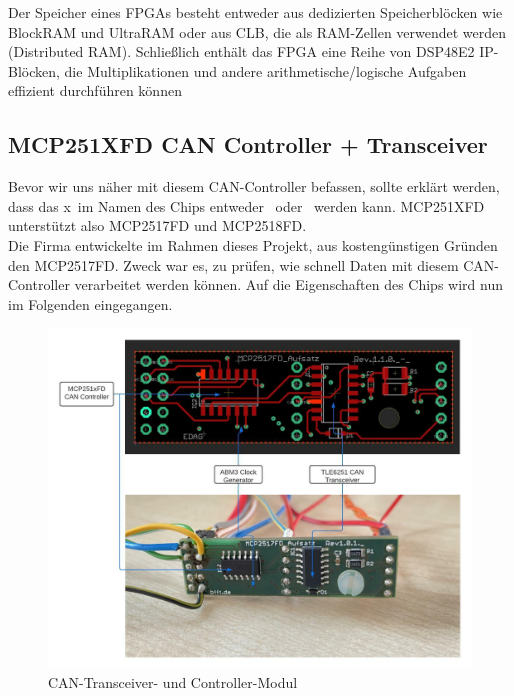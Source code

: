 Der Speicher eines FPGAs besteht entweder aus dedizierten Speicherblöcken wie BlockRAM und UltraRAM oder aus CLB, die als RAM-Zellen verwendet werden (Distributed RAM). Schließlich enthält das FPGA eine Reihe von DSP48E2 IP-Blöcken, die Multiplikationen und andere arithmetische/logische Aufgaben effizient durchführen können

\subsection{MCP251XFD CAN Controller + Transceiver}
Bevor wir uns näher mit diesem CAN-Controller befassen, sollte erklärt werden, dass das \grqq x\grqq\ im Namen des Chips entweder \grqq\ oder \grqq\ werden kann. MCP251XFD unterstützt also MCP2517FD und MCP2518FD.\\
Die Firma entwickelte im Rahmen dieses Projekt, aus kostengünstigen Gründen den  MCP2517FD. Zweck war es, zu prüfen, wie schnell Daten mit diesem CAN-Controller verarbeitet werden können. Auf die Eigenschaften des Chips wird nun im Folgenden eingegangen.

\begin{figure}[h]
	\begin{center}
		\includegraphics[width=1\textwidth]{./images/mcp_ic_phy.jpg}
	\end{center}
	\vspace{-5pt}
	\caption[CAN-Transceiver- und Controller-Modul]{CAN-Transceiver- und Controller-Modul} %
	\label{fig:can:controller:transciever}
	\vspace{-5pt}
\end{figure}

